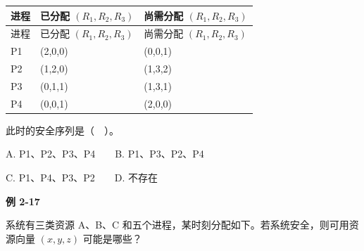 \par\smallskip
{\fontsize{9.3}{12}\selectfont\setlength{\tabcolsep}{2.5pt}\setlength{\LTleft}{0pt}\setlength{\LTright}{0pt}
\begin{longtable}{@{}>{\raggedright\arraybackslash}p{}>{\raggedright\arraybackslash}p{}>{\raggedright\arraybackslash}p{}@{}}
\toprule
进程 & 已分配 \((R_1,R_2,R_3)\) & 尚需分配 \((R_1,R_2,R_3)\) \\

\midrule\endfirsthead\toprule
进程 & 已分配 \((R_1,R_2,R_3)\) & 尚需分配 \((R_1,R_2,R_3)\) \\

\midrule\endhead\bottomrule\endfoot
P1 & (2,0,0) & (0,0,1) \\

P2 & (1,2,0) & (1,3,2) \\

P3 & (0,1,1) & (1,3,1) \\

P4 & (0,0,1) & (2,0,0) \\

\end{longtable}}
\par\smallskip

此时的安全序列是（　）。

A. P1、P2、P3、P4　　B. P1、P3、P2、P4

C. P1、P4、P3、P2　　D. 不存在

\par\medskip{}\noindent\hypertarget{OS02-E17}{}\label{OS02-E17}\textbf{例 2-17}\par\nobreak\smallskip

系统有三类资源 A、B、C 和五个进程，某时刻分配如下。若系统安全，则可用资源向量 \((x,y,z)\) 可能是哪些？

